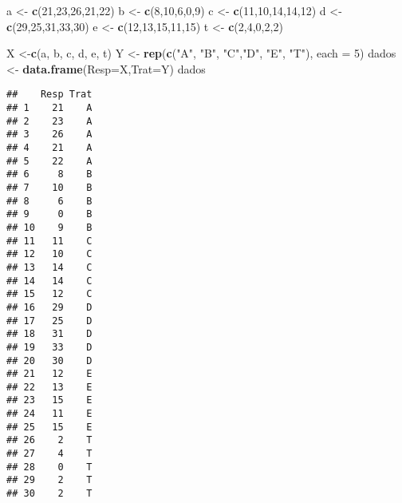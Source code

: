 \documentclass[
]{article}
\newenvironment{Shaded}{\begin{snugshade}}{\end{snugshade}}
\newcommand{\AttributeTok}[1]{\textcolor[rgb]{0.13,0.29,0.53}{#1}}
\newcommand{\DecValTok}[1]{\textcolor[rgb]{0.00,0.00,0.81}{#1}}
\newcommand{\FunctionTok}[1]{\textcolor[rgb]{0.13,0.29,0.53}{\textbf{#1}}}
\newcommand{\NormalTok}[1]{#1}
\newcommand{\OtherTok}[1]{\textcolor[rgb]{0.56,0.35,0.01}{#1}}
\newcommand{\StringTok}[1]{\textcolor[rgb]{0.31,0.60,0.02}{#1}}
\begin{document}
\begin{Shaded}
\begin{Highlighting}[]
\NormalTok{a }\OtherTok{\textless{}{-}} \FunctionTok{c}\NormalTok{(}\DecValTok{21}\NormalTok{,}\DecValTok{23}\NormalTok{,}\DecValTok{26}\NormalTok{,}\DecValTok{21}\NormalTok{,}\DecValTok{22}\NormalTok{)}
\NormalTok{b }\OtherTok{\textless{}{-}} \FunctionTok{c}\NormalTok{(}\DecValTok{8}\NormalTok{,}\DecValTok{10}\NormalTok{,}\DecValTok{6}\NormalTok{,}\DecValTok{0}\NormalTok{,}\DecValTok{9}\NormalTok{)}
\NormalTok{c }\OtherTok{\textless{}{-}} \FunctionTok{c}\NormalTok{(}\DecValTok{11}\NormalTok{,}\DecValTok{10}\NormalTok{,}\DecValTok{14}\NormalTok{,}\DecValTok{14}\NormalTok{,}\DecValTok{12}\NormalTok{)}
\NormalTok{d }\OtherTok{\textless{}{-}} \FunctionTok{c}\NormalTok{(}\DecValTok{29}\NormalTok{,}\DecValTok{25}\NormalTok{,}\DecValTok{31}\NormalTok{,}\DecValTok{33}\NormalTok{,}\DecValTok{30}\NormalTok{)}
\NormalTok{e }\OtherTok{\textless{}{-}} \FunctionTok{c}\NormalTok{(}\DecValTok{12}\NormalTok{,}\DecValTok{13}\NormalTok{,}\DecValTok{15}\NormalTok{,}\DecValTok{11}\NormalTok{,}\DecValTok{15}\NormalTok{)}
\NormalTok{t }\OtherTok{\textless{}{-}} \FunctionTok{c}\NormalTok{(}\DecValTok{2}\NormalTok{,}\DecValTok{4}\NormalTok{,}\DecValTok{0}\NormalTok{,}\DecValTok{2}\NormalTok{,}\DecValTok{2}\NormalTok{)}

\NormalTok{X }\OtherTok{\textless{}{-}}\FunctionTok{c}\NormalTok{(a, b, c, d, e, t)}
\NormalTok{Y }\OtherTok{\textless{}{-}} \FunctionTok{rep}\NormalTok{(}\FunctionTok{c}\NormalTok{(}\StringTok{"A"}\NormalTok{, }\StringTok{"B"}\NormalTok{, }\StringTok{"C"}\NormalTok{,}\StringTok{"D"}\NormalTok{, }\StringTok{"E"}\NormalTok{, }\StringTok{"T"}\NormalTok{), }\AttributeTok{each =} \DecValTok{5}\NormalTok{)}
\NormalTok{dados }\OtherTok{\textless{}{-}} \FunctionTok{data.frame}\NormalTok{(}\AttributeTok{Resp=}\NormalTok{X,}\AttributeTok{Trat=}\NormalTok{Y)}
\NormalTok{dados}
\end{Highlighting}
\end{Shaded}

\begin{verbatim}
##    Resp Trat
## 1    21    A
## 2    23    A
## 3    26    A
## 4    21    A
## 5    22    A
## 6     8    B
## 7    10    B
## 8     6    B
## 9     0    B
## 10    9    B
## 11   11    C
## 12   10    C
## 13   14    C
## 14   14    C
## 15   12    C
## 16   29    D
## 17   25    D
## 18   31    D
## 19   33    D
## 20   30    D
## 21   12    E
## 22   13    E
## 23   15    E
## 24   11    E
## 25   15    E
## 26    2    T
## 27    4    T
## 28    0    T
## 29    2    T
## 30    2    T
\end{verbatim}
\end{document}
